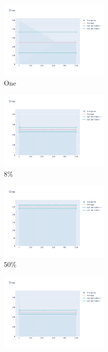 \documentclass[12pt, fleqn]{report}                             %
\theoremstyle{break}                                            %
\begin{document}
      \begin{figure}[ht!]
        \centering
        \begin{subfigure}[b]{0.4\linewidth}
          \includegraphics[width=0.6\textwidth]{Images/45/dia-a.png}
          \caption{One}
        \end{subfigure}
        \begin{subfigure}[b]{0.4\linewidth}
          \includegraphics[width=0.6\textwidth]{Images/45/dia-b.png}
          \caption{8\%}
        \end{subfigure}
        \begin{subfigure}[b]{0.4\linewidth}
          \includegraphics[width=0.6\textwidth]{Images/45/dia-c.png}
          \caption{50\%}
        \end{subfigure}
        \begin{subfigure}[b]{0.4\linewidth}
          \includegraphics[width=0.6\textwidth]{Images/45/dia-d.png}

\end{subfigure}
\end{figure}
\end{document}
